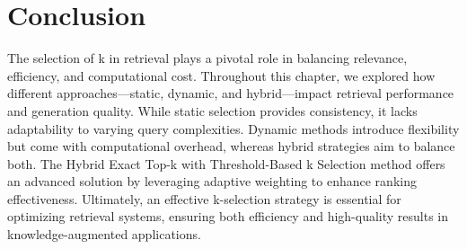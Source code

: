 \section{ Conclusion }
The selection of k in retrieval plays a pivotal role in balancing relevance, efficiency, and computational cost. Throughout this chapter, we explored how different approaches—static, dynamic, and hybrid—impact retrieval performance and generation quality. While static selection provides consistency, it lacks adaptability to varying query complexities. Dynamic methods introduce flexibility but come with computational overhead, whereas hybrid strategies aim to balance both. The Hybrid Exact Top-k with Threshold-Based k Selection method offers an advanced solution by leveraging adaptive weighting to enhance ranking effectiveness. Ultimately, an effective k-selection strategy is essential for optimizing retrieval systems, ensuring both efficiency and high-quality results in knowledge-augmented applications.
